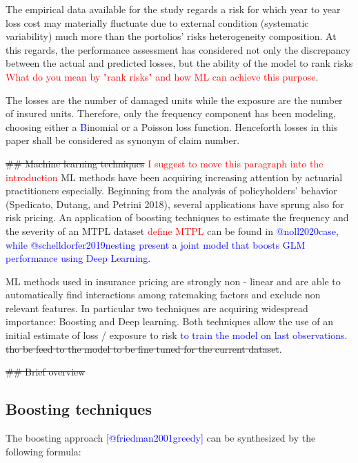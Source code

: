 \documentclass[
]{article}
\begin{document}
The empirical data available for the study regards a risk for which year
to year loss cost may materially fluctuate due to external condition
(systematic variability) much more than the portolios' risks
heterogeneity composition. At this regards, the performance assessment
has considered not only the discrepancy between the actual and predicted
losses, but the ability of the model to rank risks
\textcolor{red}{What do you mean by "rank risks" and how ML can achieve this purpose}.

The losses are the number of damaged units while the exposure are the
number of insured units. Therefore\textcolor{blue}{,} only the frequency
component has been modeling, choosing either a
\textcolor{blue}{B}inomial or a Poisson loss function. Henceforth losses
in this paper shall be considered as synonym of claim number.

\sout{\#\# Machine learning techniques}
\textcolor{red}{I suggest to  move this paragraph into the introduction}
ML methods have been acquiring increasing attention by actuarial
practitioners especially. Beginning from the analysis of policyholders'
behavior (Spedicato, Dutang, and Petrini 2018), several applications
have sprung also for risk pricing. An application of boosting techniques
to estimate the frequency and the severity of an MTPL dataset
\textcolor{red}{define MTPL} can be found in
\textcolor{blue}{@noll2020case, while @schelldorfer2019nesting present a joint model that boosts GLM performance using Deep Learning}.

ML methods used in insurance pricing are strongly non - linear and are
able to automatically find interactions among ratemaking factors and
exclude non relevant features. In particular two techniques are
acquiring widespread importance: Boosting and Deep learning. Both
techniques allow the use of an initial estimate of loss / exposure to
risk \textcolor{blue}{to train the model on last observations.}
\sout{tho be feed to the model to be fine tuned for the current
dataset}.

\sout{\#\# Brief overview}

\hypertarget{boosting-techniques}{%
\subsection{Boosting techniques}\label{boosting-techniques}}

The boosting approach \textcolor{blue}{[@friedman2001greedy]} can be
synthesized by the following formula:
\end{document}
